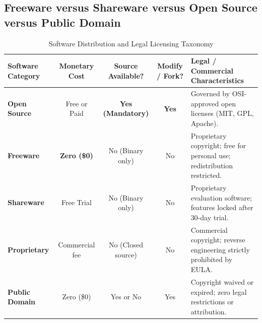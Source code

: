 \subsection{Freeware versus Shareware versus Open Source versus Public Domain}
\begin{table}[htbp]
\centering
\small
\caption{Software Distribution and Legal Licensing Taxonomy}
\label{tab:software_licensing_taxonomy}
\begin{tabularx}{\textwidth}{l c c c X}
\toprule
\textbf{Software Category} & \textbf{Monetary Cost} & \textbf{Source Available?} & \textbf{Modify / Fork?} & \textbf{Legal / Commercial Characteristics} \\
\midrule
\textbf{Open Source} & Free or Paid & \textbf{Yes (Mandatory)} & \textbf{Yes} & Governed by OSI-approved open licenses (MIT, GPL, Apache). \\
\textbf{Freeware} & \textbf{Zero (\$0)} & No (Binary only) & No & Proprietary copyright; free for personal use; redistribution restricted. \\
\textbf{Shareware} & Free Trial & No (Binary only) & No & Proprietary evaluation software; features locked after 30-day trial. \\
\textbf{Proprietary} & Commercial fee & No (Closed source) & No & Commercial copyright; reverse engineering strictly prohibited by EULA. \\
\textbf{Public Domain} & Zero (\$0) & Yes or No & Yes & Copyright waived or expired; zero legal restrictions or attribution. \\
\bottomrule
\end{tabularx}
\end{table}

